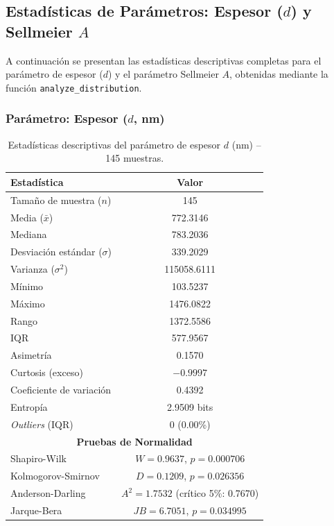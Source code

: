 \documentclass{article}
\begin{document}
\subsection{Estad\'isticas de Par\'ametros: Espesor ($d$) y Sellmeier $A$}

A continuaci\'on se presentan las estad\'isticas descriptivas completas para el par\'ametro de espesor ($d$) y el par\'ametro Sellmeier $A$, obtenidas mediante la funci\'on \texttt{analyze\_distribution}.

\subsubsection{Par\'ametro: Espesor ($d$, nm)}

\begin{table}[htbp]
\centering
\caption{Estad\'isticas descriptivas del par\'ametro de espesor $d$ (nm) -- 145 muestras.}
\label{tab:stats-d}
\begin{tabular}{@{}lc@{}}
\toprule
\textbf{Estad\'istica} & \textbf{Valor} \\
\midrule
Tama\~no de muestra ($n$) & 145 \\
Media ($\bar{x}$) & 772.3146 \\
Mediana & 783.2036 \\
Desviaci\'on est\'andar ($\sigma$) & 339.2029 \\
Varianza ($\sigma^2$) & 115058.6111 \\
M\'inimo & 103.5237 \\
M\'aximo & 1476.0822 \\
Rango & 1372.5586 \\
IQR & 577.9567 \\
\midrule
Asimetr\'ia & 0.1570 \\
Curtosis (exceso) & $-0.9997$ \\
Coeficiente de variaci\'on & 0.4392 \\
Entrop\'ia & 2.9509 bits \\
\midrule
\textit{Outliers} (IQR) & 0 (0.00\%) \\
\midrule
\multicolumn{2}{c}{\textbf{Pruebas de Normalidad}} \\
\midrule
Shapiro-Wilk & $W = 0.9637$, $p = 0.000706$ \\
Kolmogorov-Smirnov & $D = 0.1209$, $p = 0.026356$ \\
Anderson-Darling & $A^2 = 1.7532$ (cr\'itico 5\%: 0.7670) \\
Jarque-Bera & $JB = 6.7051$, $p = 0.034995$ \\
\bottomrule
\end{tabular}
\end{table}
\end{document}
